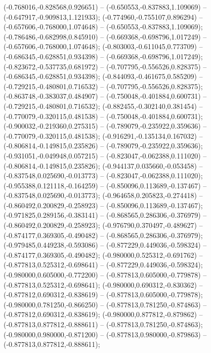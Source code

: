  (-0.768016,-0.828568,0.926651) -- (-0.650553,-0.837883,1.109069) -- (-0.647917,-0.909813,1.121933);
 (-0.774960,-0.755107,0.896294) -- (-0.657606,-0.768000,1.074648) -- (-0.650553,-0.837883,1.109069);
 (-0.786486,-0.682998,0.845910) -- (-0.669368,-0.698796,1.017249) -- (-0.657606,-0.768000,1.074648);
 (-0.803003,-0.611045,0.773709) -- (-0.686345,-0.628851,0.934398) -- (-0.669368,-0.698796,1.017249);
 (-0.823672,-0.537735,0.681972) -- (-0.707795,-0.556526,0.828375) -- (-0.686345,-0.628851,0.934398);
 (-0.844093,-0.461675,0.585209) -- (-0.729215,-0.480801,0.716532) -- (-0.707795,-0.556526,0.828375);
 (-0.863748,-0.383037,0.484907) -- (-0.750048,-0.401884,0.600731) -- (-0.729215,-0.480801,0.716532);
 (-0.882455,-0.302140,0.381454) -- (-0.770079,-0.320115,0.481538) -- (-0.750048,-0.401884,0.600731);
 (-0.900032,-0.219360,0.275315) -- (-0.789079,-0.235922,0.359636) -- (-0.770079,-0.320115,0.481538);
 (-0.916291,-0.135134,0.167032) -- (-0.806814,-0.149815,0.235826) -- (-0.789079,-0.235922,0.359636);
 (-0.931051,-0.049948,0.057215) -- (-0.823047,-0.062388,0.111020) -- (-0.806814,-0.149815,0.235826);
 (-0.944137,0.035660,-0.053458) -- (-0.837548,0.025690,-0.013773) -- (-0.823047,-0.062388,0.111020);
 (-0.955388,0.121118,-0.164259) -- (-0.850096,0.113689,-0.137467) -- (-0.837548,0.025690,-0.013773);
 (-0.964658,0.205823,-0.274418) -- (-0.860492,0.200829,-0.258923) -- (-0.850096,0.113689,-0.137467);
 (-0.971825,0.289156,-0.383141) -- (-0.868565,0.286306,-0.376979) -- (-0.860492,0.200829,-0.258923);
 (-0.976790,0.370497,-0.489627) -- (-0.874177,0.369305,-0.490482) -- (-0.868565,0.286306,-0.376979);
 (-0.979485,0.449238,-0.593086) -- (-0.877229,0.449036,-0.598324) -- (-0.874177,0.369305,-0.490482);
 (-0.980000,0.525312,-0.691762) -- (-0.877813,0.525312,-0.698641) -- (-0.877229,0.449036,-0.598324);
 (-0.980000,0.605000,-0.772200) -- (-0.877813,0.605000,-0.779878) -- (-0.877813,0.525312,-0.698641);
 (-0.980000,0.690312,-0.830362) -- (-0.877812,0.690312,-0.838619) -- (-0.877813,0.605000,-0.779878);
 (-0.980000,0.781250,-0.866250) -- (-0.877813,0.781250,-0.874863) -- (-0.877812,0.690312,-0.838619);
 (-0.980000,0.877812,-0.879862) -- (-0.877813,0.877812,-0.888611) -- (-0.877813,0.781250,-0.874863);
 (-0.980000,0.980000,-0.871200) -- (-0.877813,0.980000,-0.879863) -- (-0.877813,0.877812,-0.888611);

